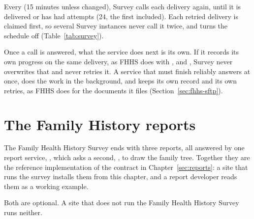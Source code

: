 \documentclass[11pt, a4paper]{article}
\begin{document}
Every  (15 minutes unless changed), Survey calls
each  delivery again, until it is delivered or has had
 attempts (24, the first included). Each
retried delivery is claimed first, so several Survey instances never call it twice, and
 turns the schedule off (Table~\ref{tab:survey}).

\begin{elicitcaution}
Once a call is answered, what the service does next is its own. If it records its own progress
on the same delivery, as FHHS does with ,  and , Survey
never overwrites that and never retries it. A service that must finish reliably answers at once,
does the work in the background, and keeps its own record and its own retries, as FHHS does for
the documents it files (Section~\ref{sec:fhhs-sftp}).
\end{elicitcaution}

\section{The Family History reports}
\label{sec:fhhs}

The Family Health History Survey ends with three reports, all answered by one report service,
, which asks a second, , to draw the family tree. Together they are the
reference implementation of the contract in Chapter~\ref{sec:reports}: a site that runs the
survey installs them from this chapter, and a report developer reads them as a working
example.

Both are optional. A site that does not run the Family Health History Survey runs neither.
\end{document}
